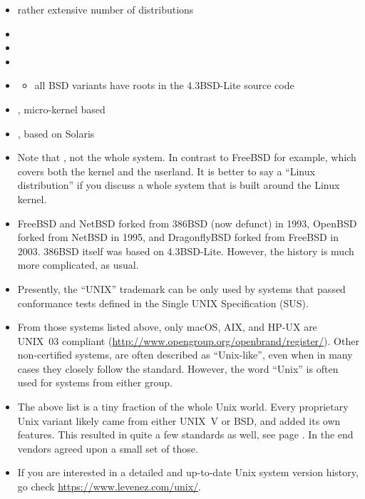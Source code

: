 \begin{slide}

\begin{itemize}
\item rather extensive number of  distributions
\item {}
\item {}
\item {}
\item {}
\begin{itemize}
\item all BSD variants have roots in the 4.3BSD-Lite source code
\end{itemize}
\item {}, micro-kernel based
\item {}, based on Solaris
\end{itemize}
\end{slide}

\begin{itemize}
\item Note that , not the whole system.  In contrast to
FreeBSD for example, which covers both the kernel and the userland.  It is
better to say a ``Linux distribution'' if you discuss a whole system that is
built around the Linux kernel.
\item FreeBSD and NetBSD forked from 386BSD (now defunct) in 1993, OpenBSD
forked from NetBSD in 1995, and DragonflyBSD forked from FreeBSD in 2003.
386BSD itself was based on 4.3BSD-Lite.  However, the history is much more
complicated, as usual.
\item Presently, the ``UNIX'' trademark can be only used by systems that passed
conformance tests defined in the Single UNIX Specification (SUS).
\item From those systems listed above, only macOS, AIX, and HP-UX are
UNIX~03 compliant (\url{http://www.opengroup.org/openbrand/register/}).  Other
non-certified systems, are often described as ``Unix-like'', even when in many
cases they closely follow the standard.  However, the word ``Unix'' is often used
for systems from either group.
\item The above list is a tiny fraction of the whole Unix world.  Every
proprietary Unix variant likely came from either UNIX~V or BSD, and added its
own features.  This resulted in quite a few standards as well, see page
\pageref{UNIXSTANDARDS}.  In the end vendors agreed upon a small set of those.
\item If you are interested in a detailed and up-to-date Unix system version
history, go check \url{https://www.levenez.com/unix/}.
\end{itemize}

